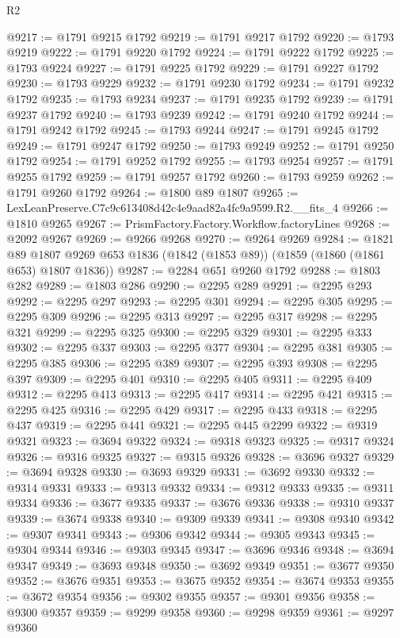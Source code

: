 \begin{lexlean}{R2}
\begin{coremodule}
@9217 := @1791 @9215 @1792
@9219 := @1791 @9217 @1792
@9220 := @1793 @9219
@9222 := @1791 @9220 @1792
@9224 := @1791 @9222 @1792
@9225 := @1793 @9224
@9227 := @1791 @9225 @1792
@9229 := @1791 @9227 @1792
@9230 := @1793 @9229
@9232 := @1791 @9230 @1792
@9234 := @1791 @9232 @1792
@9235 := @1793 @9234
@9237 := @1791 @9235 @1792
@9239 := @1791 @9237 @1792
@9240 := @1793 @9239
@9242 := @1791 @9240 @1792
@9244 := @1791 @9242 @1792
@9245 := @1793 @9244
@9247 := @1791 @9245 @1792
@9249 := @1791 @9247 @1792
@9250 := @1793 @9249
@9252 := @1791 @9250 @1792
@9254 := @1791 @9252 @1792
@9255 := @1793 @9254
@9257 := @1791 @9255 @1792
@9259 := @1791 @9257 @1792
@9260 := @1793 @9259
@9262 := @1791 @9260 @1792
@9264 := @1800 @89 @1807
@9265 := LexLeanPreserve.C7c9c613408d42c4e9aad82a4fc9a9599.R2.__fits_4
@9266 := @1810 @9265
@9267 := PrismFactory.Factory.Workflow.factoryLines
@9268 := @2092 @9267
@9269 := @9266 @9268
@9270 := @9264 @9269
@9284 := @1821
    @89
    @1807
    @9269
    @653
    @1836
    (@1842 (@1853 @89))
    (@1859 (@1860 (@1861 @653) @1807 @1836))
@9287 := @2284 @651 @9260 @1792
@9288 := @1803 @282
@9289 := @1803 @286
@9290 := @2295 @289
@9291 := @2295 @293
@9292 := @2295 @297
@9293 := @2295 @301
@9294 := @2295 @305
@9295 := @2295 @309
@9296 := @2295 @313
@9297 := @2295 @317
@9298 := @2295 @321
@9299 := @2295 @325
@9300 := @2295 @329
@9301 := @2295 @333
@9302 := @2295 @337
@9303 := @2295 @377
@9304 := @2295 @381
@9305 := @2295 @385
@9306 := @2295 @389
@9307 := @2295 @393
@9308 := @2295 @397
@9309 := @2295 @401
@9310 := @2295 @405
@9311 := @2295 @409
@9312 := @2295 @413
@9313 := @2295 @417
@9314 := @2295 @421
@9315 := @2295 @425
@9316 := @2295 @429
@9317 := @2295 @433
@9318 := @2295 @437
@9319 := @2295 @441
@9321 := @2295 @445 @2299
@9322 := @9319 @9321
@9323 := @3694 @9322
@9324 := @9318 @9323
@9325 := @9317 @9324
@9326 := @9316 @9325
@9327 := @9315 @9326
@9328 := @3696 @9327
@9329 := @3694 @9328
@9330 := @3693 @9329
@9331 := @3692 @9330
@9332 := @9314 @9331
@9333 := @9313 @9332
@9334 := @9312 @9333
@9335 := @9311 @9334
@9336 := @3677 @9335
@9337 := @3676 @9336
@9338 := @9310 @9337
@9339 := @3674 @9338
@9340 := @9309 @9339
@9341 := @9308 @9340
@9342 := @9307 @9341
@9343 := @9306 @9342
@9344 := @9305 @9343
@9345 := @9304 @9344
@9346 := @9303 @9345
@9347 := @3696 @9346
@9348 := @3694 @9347
@9349 := @3693 @9348
@9350 := @3692 @9349
@9351 := @3677 @9350
@9352 := @3676 @9351
@9353 := @3675 @9352
@9354 := @3674 @9353
@9355 := @3672 @9354
@9356 := @9302 @9355
@9357 := @9301 @9356
@9358 := @9300 @9357
@9359 := @9299 @9358
@9360 := @9298 @9359
@9361 := @9297 @9360

\end{coremodule}
\end{lexlean}
